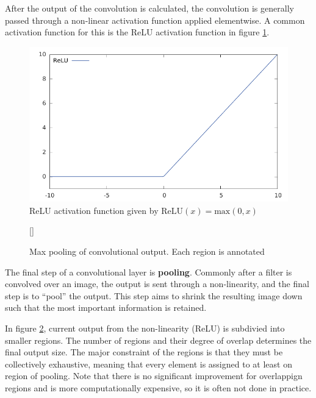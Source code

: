 \documentclass[11pt]{article}
\begin{document}
After the output of the convolution is calculated, the convolution is generally passed through a non-linear activation function applied elementwise. A common activation function for this is the ReLU activation function in figure \ref{fig:relu}.

\begin{minipage}{0.47\linewidth}
  \centering
  \begin{figure}[H]
    \includegraphics[width=\linewidth]{relu}
    \caption{ReLU activation function given by $\mathrm{ReLU}(x) = \mathrm{max}(0,x)$}
    \label{fig:relu}
  \end{figure}
\end{minipage}\hfill
\begin{minipage}{0.47\linewidth}
  \begin{figure}[H]
    [\FBwidth]
    {\caption{Max pooling of convolutional output. Each region is annotated}\label{fig:pool_ex}}{
    }
  \end{figure}
\end{minipage}\vspace{0.5cm}

The final step of a convolutional layer is \textbf{pooling}. Commonly after a filter is convolved over an image, the output is sent through a non-linearity, and the final step is to ``pool'' the output. This step aims to shrink the resulting image down such that the most important information is retained.

In figure \ref{fig:pool_ex}, current output from the non-linearity (ReLU) is subdivied into smaller regions. The number of regions and their degree of overlap determines the final output size. The major constraint of the regions is that they must be collectively exhaustive, meaning that every element is assigned to at least on region of pooling. Note that there is no significant improvement for overlappign regions \cite{scherer2010evaluation} and is more computationally expensive, so it is often not done in practice.
\end{document}
